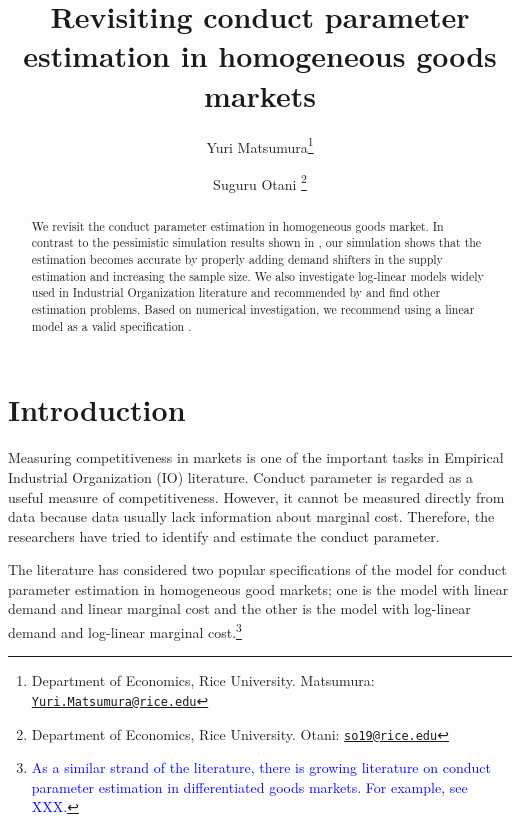 \documentclass[11pt, a4paper]{article}
\title{Revisiting conduct
parameter estimation in homogeneous goods markets}
\author{Yuri Matsumura\footnote{Department of Economics, Rice University. Matsumura: \texttt{\href{mailto:Yuri.Matsumura@rice.edu}{Yuri.Matsumura@rice.edu}}} \and Suguru Otani \footnote{Department of Economics, Rice University. Otani: \texttt{\href{mailto:so19@rice.edu}{so19@rice.edu}}}}
\begin{document}
\maketitle

\begin{abstract}
    We revisit the conduct parameter estimation in homogeneous goods market. In contrast to the pessimistic simulation results shown in \cite{perloff2012collinearity}, our simulation shows that the estimation becomes accurate by properly adding demand shifters in the supply estimation and increasing the sample size. We also investigate log-linear models widely used in Industrial Organization literature and recommended by \cite{perloff2012collinearity} and find other estimation problems. Based on numerical investigation, we recommend using a linear model as a valid specification . %
\end{abstract}

\section{Introduction}
Measuring competitiveness in markets is one of the important tasks in Empirical Industrial Organization (IO) literature.
Conduct parameter is regarded as a useful measure of competitiveness. 
However, it cannot be measured directly from data because data usually lack information about marginal cost.
Therefore, the researchers have tried to identify and estimate the conduct parameter.


The literature has considered two popular specifications of the model for conduct parameter estimation in homogeneous good markets; one is the model with linear demand and linear marginal cost and the other is the model with log-linear demand and log-linear marginal cost.\footnote{\textcolor{blue}{As a similar strand of the literature, there is growing literature on conduct parameter estimation in differentiated goods markets. For example, see XXX.}}
\end{document}

